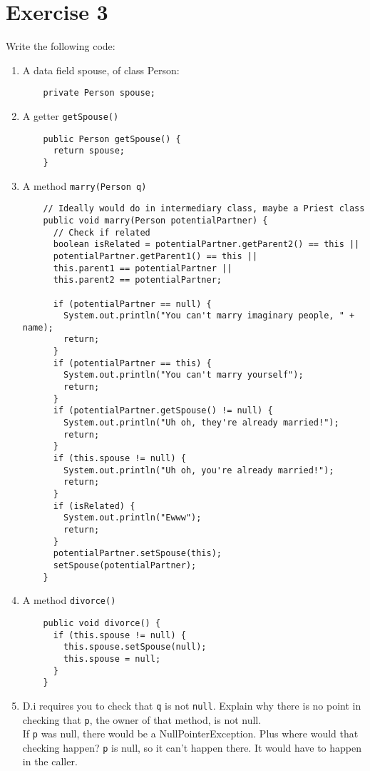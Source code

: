 \documentclass[12pt]{article}
\begin{document}
\section{Exercise 3}
Write the following code:
\begin{enumerate}[label=(\alph*)]
\item A data field spouse, of class Person:
  \begin{verbatim}
    private Person spouse;
  \end{verbatim}
\item A getter {\tt getSpouse()}
  \begin{verbatim}
    public Person getSpouse() {
      return spouse;
    }
  \end{verbatim}
\item A method {\tt marry(Person q)}
  \begin{verbatim}
    // Ideally would do in intermediary class, maybe a Priest class
    public void marry(Person potentialPartner) {
      // Check if related
      boolean isRelated = potentialPartner.getParent2() == this ||
      potentialPartner.getParent1() == this ||
      this.parent1 == potentialPartner ||
      this.parent2 == potentialPartner;

      if (potentialPartner == null) {
        System.out.println("You can't marry imaginary people, " + name);
        return;
      }
      if (potentialPartner == this) {
        System.out.println("You can't marry yourself");
        return;
      }
      if (potentialPartner.getSpouse() != null) {
        System.out.println("Uh oh, they're already married!");
        return;
      }
      if (this.spouse != null) {
        System.out.println("Uh oh, you're already married!");
        return;
      }
      if (isRelated) {
        System.out.println("Ewww");
        return;
      }
      potentialPartner.setSpouse(this);
      setSpouse(potentialPartner);
    }
  \end{verbatim}
\item A method {\tt divorce() }
  \begin{verbatim}
    public void divorce() {
      if (this.spouse != null) {
        this.spouse.setSpouse(null);
        this.spouse = null;
      }
    }
  \end{verbatim}
\item D.i requires you to check that {\tt q} is not {\tt null}. Explain why
  there is no point in checking that {\tt p}, the owner of that method, is not null. \\

  If {\tt p} was null, there would be a NullPointerException. Plus where would
  that checking happen? {\tt p} is null, so it can't happen there. It would have
  to happen in the caller.

\end{enumerate}
\end{document}
